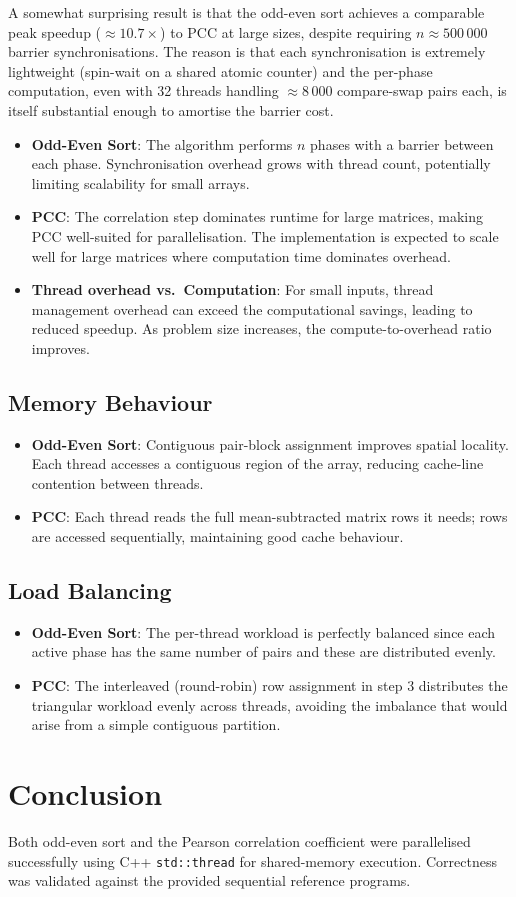 \documentclass[11pt,a4paper]{article}
\begin{document}
A somewhat surprising result is that the odd-even sort achieves a comparable peak speedup
($\approx 10.7\times$) to PCC at large sizes, despite requiring $n \approx 500\,000$ barrier
synchronisations. The reason is that each synchronisation is extremely lightweight (spin-wait on
a shared atomic counter) and the per-phase computation, even with 32 threads handling $\approx 8\,000$
compare-swap pairs each, is itself substantial enough to amortise the barrier cost.
\begin{itemize}
    \item \textbf{Odd-Even Sort}: The algorithm performs $n$ phases with a barrier between each
          phase. Synchronisation overhead grows with thread count, potentially limiting scalability
          for small arrays.
    \item \textbf{PCC}: The correlation step dominates runtime for large matrices, making PCC
          well-suited for parallelisation. The implementation is expected to scale well for
          large matrices where computation time dominates overhead.
    \item \textbf{Thread overhead vs.\ Computation}: For small inputs, thread management overhead
          can exceed the computational savings, leading to reduced speedup. As problem size
          increases, the compute-to-overhead ratio improves.
\end{itemize}

\subsection{Memory Behaviour}

\begin{itemize}
    \item \textbf{Odd-Even Sort}: Contiguous pair-block assignment improves spatial locality.
          Each thread accesses a contiguous region of the array, reducing cache-line contention between threads.
    \item \textbf{PCC}: Each thread reads the full mean-subtracted matrix rows it needs; rows
          are accessed sequentially, maintaining good cache behaviour.
\end{itemize}

\subsection{Load Balancing}

\begin{itemize}
    \item \textbf{Odd-Even Sort}: The per-thread workload is perfectly balanced since each
          active phase has the same number of pairs and these are distributed evenly.
    \item \textbf{PCC}: The interleaved (round-robin) row assignment in step 3 distributes
          the triangular workload evenly across threads, avoiding the imbalance that would arise from a simple contiguous partition.
\end{itemize}

\section{Conclusion}

Both odd-even sort and the Pearson correlation coefficient were parallelised successfully using
C++ \texttt{std::thread} for shared-memory execution. Correctness was validated against the
provided sequential reference programs.
\end{document}
